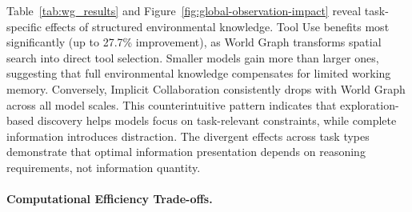 Table~\ref{tab:wg_results} and Figure~\ref{fig:global-observation-impact} reveal task-specific effects of structured environmental knowledge. Tool Use benefits most significantly (up to 27.7\% improvement), as World Graph transforms spatial search into direct tool selection. Smaller models gain more than larger ones, suggesting that full environmental knowledge compensates for limited working memory. Conversely, Implicit Collaboration consistently drops with World Graph across all model scales. This counterintuitive pattern indicates that exploration-based discovery helps models focus on task-relevant constraints, while complete information introduces distraction. The divergent effects across task types demonstrate that optimal information presentation depends on reasoning requirements, not information quantity.

\paragraph{Computational Efficiency Trade-offs.}
